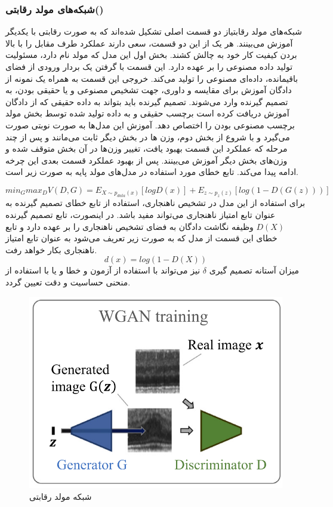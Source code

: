 \documentclass[12pt,a4paper]{report}
\begin{document}
\subsubsection{شبکه‌های مولد رقابتی()}
شبکه‌های مولد رقابتیاز دو قسمت اصلی تشکیل شده‌اند که به صورت رقابتی با یکدیگر آموزش می‌بینند. هر یک از این دو قسمت، سعی دارند عملکرد طرف مقابل را با بالا بردن کیفیت کار خود به چالش کشند. بخش اول این مدل که مولد نام دارد، مسئولیت تولید داده مصنوعی را بر عهده دارد. این قسمت با گرفتن یک بردار ورودی از فضای باقیمانده، داده‌ای مصنوعی را تولید می‌کند. خروجی این قسمت به همراه یک نمونه از دادگان آموزش برای مقایسه و داوری، جهت تشخیص مصنوعی و یا حقیقی بودن، به تصمیم گیرنده وارد می‌شوند. تصمیم گیرنده باید بتواند به داده حقیقی که از دادگان آموزش دریافت کرده است برچسب حقیقی و به داده تولید شده توسط بخش مولد برچسب مصنوعی بودن را اختصاص دهد. آموزش این مدل‌ها به صورت نوبتی صورت می‌گیرد و با شروع از بخش دوم، وزن ها در بخش دیگر ثابت می‌مانند و پس از چند مرحله که عملکرد این قسمت بهبود یافت، تغییر وزن‌ها در آن بخش متوقف شده و وزن‌های بخش دیگر آموزش می‌بینند. پس از بهبود عملکرد قسمت بعدی این چرخه ادامه پیدا می‌کند. تابع خطای مورد استفاده در مدل‌های مولد پایه به صورت زیر است.

\begin{equation}
	min_G max_D V(D, G) = E_{X \sim p_{data}(x)}[logD(x)] + E_{z \sim p_z(z)}[log(1-D(G(z)))]
\end{equation}
برای استفاده از این مدل در تشخیص ناهنجاری‌، استفاده از تابع خطای تصمیم گیرنده به عنوان تابع امتیاز ناهنجاری می‌تواند مفید باشد. در اینصورت، تابع تصمیم گیرنده $D(X)$ وظیفه نگاشت دادگان به فضای تشخیص ناهنجاری را بر عهده دارد و تابع خطای این قسمت از مدل که به صورت زیر تعریف می‌شود به عنوان تابع امتیاز ناهنجاری بکار خواهد رفت.
\begin{equation}
d(x) = log(1- D(X))
\end{equation}
 میزان آستانه تصمیم گیری $\delta$ نیز می‌تواند با استفاده از آزمون و خطا و یا با استفاده از منحنی حساسیت و دقت تعیین گردد.\\


\begin{figure}[!h]
	\begin{center}
		\includegraphics[width=0.7\linewidth]{./images/figures/gan.png}
	\end{center}
	\caption{شبکه مولد رقابتی}
	\label{fig:vae}
	\centering
\end{figure}
\end{document}

